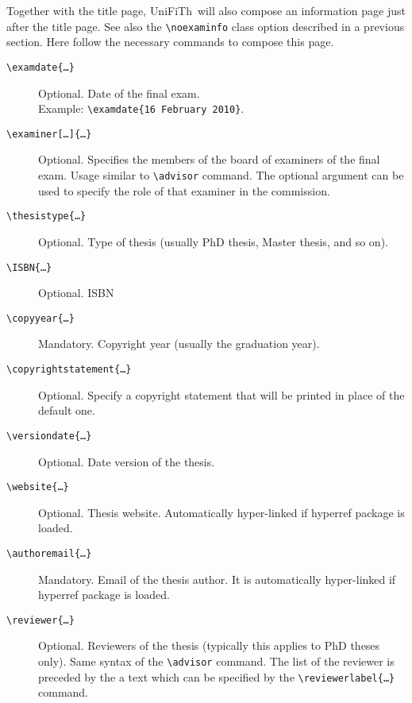 \documentclass[a5paper,11pt]{article}
\newcommand{\bs}{\textbackslash}
\newcommand{\unifith}{\textsf{UniFiTh}}
\begin{document}
Together with the title page, \unifith\ will also compose an information page just after the title page. See also the \texttt{\bs noexaminfo} class option described in a previous section. Here follow the necessary commands to compose this page.
\begin{description}
\item[\texttt{\bs examdate\{\dots\}}] Optional. Date of the final exam.\\
Example: \texttt{\bs examdate\{16 February 2010\}}.

\item[\texttt{\bs examiner[\dots]\{\dots\}}] Optional. Specifies the members of the
board of examiners of the final exam. Usage similar to \texttt{\bs advisor} command. The optional argument can be used to specify the role of that examiner in the commission.

\item[\texttt{\bs thesistype\{\dots\}}] Optional. Type of thesis (usually PhD thesis, Master thesis, and so on). 

\item[\texttt{\bs ISBN\{\dots\}}] Optional. ISBN

\item[\texttt{\bs copyyear\{\dots\}}] Mandatory. Copyright year (usually the 
graduation year).

\item[\texttt{\bs copyrightstatement\{\dots\}}] Optional. Specify a copyright statement that will be printed in place of the default one.

\item[\texttt{\bs versiondate\{\dots\}}] Optional. Date version of the thesis.

\item[\texttt{\bs website\{\dots\}}] Optional. Thesis website. Automatically 
hyper-linked if \textsf{hyperref} package is loaded.

\item[\texttt{\bs authoremail\{\dots\}}] Mandatory. Email of the thesis author.
It is automatically hyper-linked if \textsf{hyperref} package is loaded.

\item[\texttt{\bs reviewer\{\dots\}}] Optional. Reviewers of the thesis (typically this applies to PhD theses only). Same syntax of the \texttt{\bs advisor} command. The list of the reviewer is preceded by the a text which can be specified by the \texttt{\bs reviewerlabel\{\dots\}} command.


\end{description}
\end{document}
